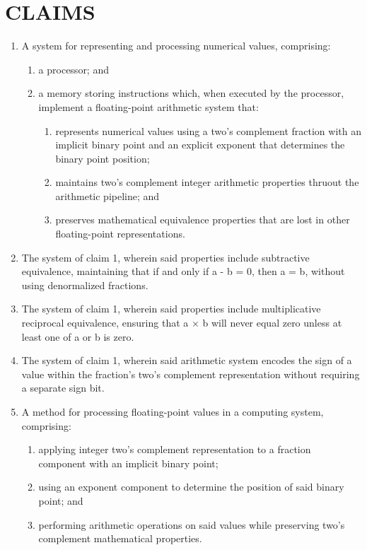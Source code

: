 \documentclass[12pt,letter]{article}
\begin{document}
\section{CLAIMS}
\begin{enumerate}
    \item A system for representing and processing numerical values, comprising:
        \begin{enumerate}
            \item a processor; and
            \item a memory storing instructions which, when executed by the processor, implement a floating-point arithmetic system that:
                \begin{enumerate}
                    \item represents numerical values using a two's complement fraction with an implicit binary point and an explicit exponent that determines the binary point position;
                    \item maintains two's complement integer arithmetic properties thruout the arithmetic pipeline; and
                    \item preserves mathematical equivalence properties that are lost in other floating-point representations.
                \end{enumerate}
        \end{enumerate}
    
    \item The system of claim 1, wherein said properties include subtractive equivalence, maintaining that if and only if a - b = 0, then a = b, without using denormalized fractions.
    
    \item The system of claim 1, wherein said properties include multiplicative reciprocal equivalence, ensuring that a × b will never equal zero unless at least one of a or b is zero.
    
    \item The system of claim 1, wherein said arithmetic system encodes the sign of a value within the fraction's two's complement representation without requiring a separate sign bit.
    
    \item A method for processing floating-point values in a computing system, comprising:
        \begin{enumerate}
            \item applying integer two's complement representation to a fraction component with an implicit binary point;
            \item using an exponent component to determine the position of said binary point; and
            \item performing arithmetic operations on said values while preserving two's complement mathematical properties.
        \end{enumerate}
    

\end{enumerate}
\end{document}
